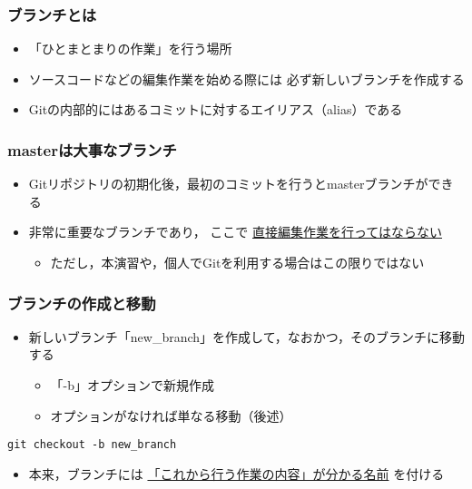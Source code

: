 \documentclass[a4paper,twoside,twocolumn]{bxjsarticle}
\begin{document}
\subsubsection{ブランチとは}
\label{sec-1-6-1}
\begin{itemize}
\item 「ひとまとまりの作業」を行う場所
\item ソースコードなどの編集作業を始める際には
必ず新しいブランチを作成する
\item Gitの内部的にはあるコミットに対するエイリアス（alias）である
\end{itemize}

\subsubsection{masterは大事なブランチ}
\label{sec-1-6-2}
\begin{itemize}
\item Gitリポジトリの初期化後，最初のコミットを行うとmasterブランチができる
\item 非常に重要なブランチであり，
ここで \uline{直接編集作業を行ってはならない}
\begin{itemize}
\item ただし，本演習や，個人でGitを利用する場合はこの限りではない
\end{itemize}
\end{itemize}

\subsubsection{ブランチの作成と移動}
\label{sec-1-6-3}
\begin{itemize}
\item 新しいブランチ「new\_branch」を作成して，なおかつ，そのブランチに移動する
\begin{itemize}
\item 「-b」オプションで新規作成
\item オプションがなければ単なる移動（後述）
\end{itemize}
\end{itemize}

\begin{verbatim}
git checkout -b new_branch
\end{verbatim}

\begin{itemize}
\item 本来，ブランチには \uline{「これから行う作業の内容」が分かる名前} を付ける
\end{itemize}
\end{document}
